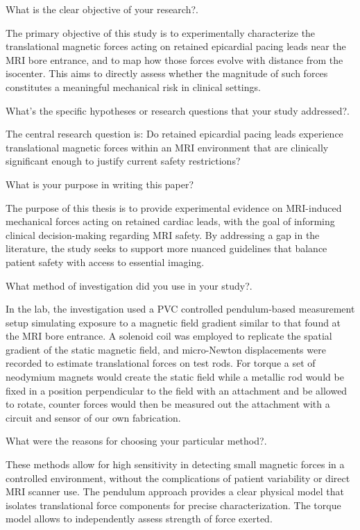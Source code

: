 What is the clear objective of your research?.

The primary objective of this study is to experimentally characterize the translational magnetic forces acting on retained epicardial pacing leads near the MRI bore entrance, and to map how those forces evolve with distance from the isocenter. This aims to directly assess whether the magnitude of such forces constitutes a meaningful mechanical risk in clinical settings.



What's the specific hypotheses or research questions that your study addressed?.

The central research question is: Do retained epicardial pacing leads experience translational magnetic forces within an MRI environment that are clinically significant enough to justify current safety restrictions?



What is your purpose in writing this paper?

The purpose of this thesis is to provide experimental evidence on MRI-induced mechanical forces acting on retained cardiac leads, with the goal of informing clinical decision-making regarding MRI safety. By addressing a gap in the literature, the study seeks to support more nuanced guidelines that balance patient safety with access to essential imaging.


What method of investigation did you use in your study?.

In the lab, the investigation used a PVC controlled pendulum-based measurement setup simulating exposure to a magnetic field gradient similar to that found at the MRI bore entrance. A solenoid coil was employed to replicate the spatial gradient of the static magnetic field, and micro-Newton displacements were recorded to estimate translational forces on test rods. For torque a set of neodymium magnets would create the static field while a metallic rod would be fixed in a position perpendicular to the field with an attachment and be allowed to rotate, counter forces would then be measured out the attachment with a circuit and sensor of our own fabrication.


What were the reasons for choosing your particular method?.

These methods allow for high sensitivity in detecting small magnetic forces in a controlled environment, without the complications of patient variability or direct MRI scanner use. The pendulum approach provides a clear physical model that isolates translational force components for precise characterization. The torque model allows to independently assess strength of force exerted.



